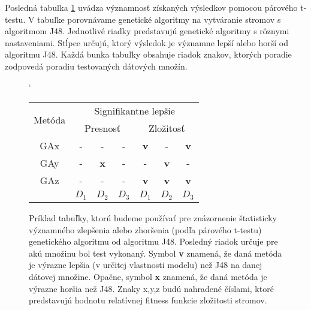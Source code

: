 Posledná tabuľka \ref{fig:tab3} uvádza významnosť získaných výsledkov pomocou párového t-testu. V tabuľke porovnávame genetické algoritmy na vytváranie stromov s algoritmom J48. Jednotlivé riadky predstavujú genetické algoritmy s rôznymi nastaveniami. Stĺpce určujú, ktorý výsledok je významne lepší alebo horší od algoritmu J48. Každá bunka tabuľky obsahuje riadok znakov, ktorých poradie zodpovedá poradiu testovaných dátových množín.

\begin{figure}[h]
\catcode`
\centering 
\newcommand\T{\rule{0pt}{2.6ex}}       %
\newcommand\B{\rule[-1.2ex]{0pt}{0pt}} %
\begin{tabular}{|c||c c c|c c c||}
\hline
\hline \multirow{2}{*}{Metóda} & \multicolumn{6}{|c||}{Signifikantne lepšie} 
\\
\cline{2-7} & \multicolumn{3}{|c|}{Presnosť} & \multicolumn{3}{|c|}{Zložitosť} \\
\hline
\hline
GAx & - & - & - & \textbf{v} & - & \textbf{v} \\ \hline
GAy & - & \textbf{x} & - & - & \textbf{v} & - \\ \hline
GAz & - & - & - & \textbf{v} & \textbf{v} & \textbf{v} \\ \hline
 & $D_1$ & $D_2$ & $D_3$ & $D_1$ & $D_2$ & $D_3$ \\ \hline
\end{tabular}
\caption{Príklad tabuľky, ktorú budeme používať pre znázornenie štatisticky významného zlepšenia alebo zhoršenia (podľa párového t-testu) genetického algoritmu od algoritmu J48. Posledný riadok určuje pre akú množinu bol test vykonaný. Symbol \textbf{v} znamená, že daná metóda je výrazne lepšia (v určitej vlastnosti modelu) než J48 na danej dátovej množine. Opačne, symbol \textbf{x} znamená, že daná metóda je výrazne horšia než J48. Znaky x,y,z budú nahradené číslami, ktoré predstavujú hodnotu relatívnej fitness funkcie zložitosti stromov.}\label{fig:tab3}
\end{figure}

